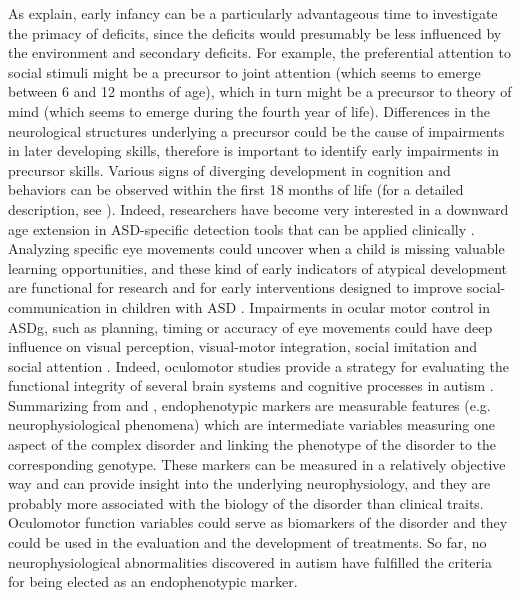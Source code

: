 As \cite{anderson2006visualscanning} explain, early infancy can be a particularly advantageous time to investigate the primacy of deficits, since the deficits would presumably be less influenced by the environment and secondary deficits. For example, the preferential attention to social stimuli might be a precursor to joint attention (which seems to emerge between 6 and 12 months of age), which in turn might be a precursor to theory of mind (which seems to emerge during the fourth year of life). Differences in the neurological structures underlying a precursor could be the cause of impairments in later developing skills, therefore is important to identify early impairments in precursor skills. Various signs of diverging development in cognition and behaviors can be observed within the first 18 months of life (for a detailed description, see \citealp{shultz2015earlydepartures}). Indeed, researchers have become very interested in a downward age extension in ASD-specific detection tools that can be applied clinically \citep{towie2016screening}.\\
Analyzing specific eye movements could uncover when a child is missing valuable learning opportunities, and these kind of early indicators of atypical development are functional for research and for early interventions designed to improve social-communication in children with ASD \citep{birmingham2017gazeselection}. Impairments in ocular motor control in ASDg, such as planning, timing or accuracy of eye movements could have deep influence on visual perception, visual-motor integration, social imitation and social attention \citep{brenner2007visualsearch,johnson2016review}. Indeed, oculomotor studies provide a strategy for evaluating the functional integrity of several brain systems and cognitive processes in autism \citep{takarae2004smoothpursuit}.\\
Summarizing from \cite{kemner2004smoothpursuit} and \cite{smyrnis2008guidelines}, endophenotypic markers are measurable features (e.g. neurophysiological phenomena) which are intermediate variables measuring one aspect of the complex disorder and linking the phenotype of the disorder to the corresponding genotype. These markers can be measured in a relatively objective way and can provide insight into the underlying neurophysiology, and they are probably more associated with the biology of the disorder than clinical traits. Oculomotor function variables could serve as biomarkers of the disorder and they could be used in the evaluation and the development of treatments. So far, no neurophysiological abnormalities discovered in autism have fulfilled the criteria for being elected as an endophenotypic marker.
